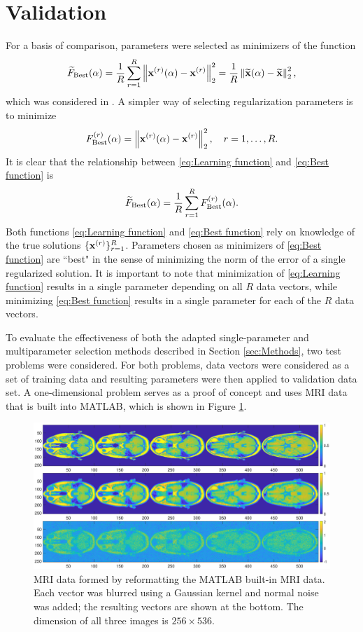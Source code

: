 \documentclass[12pt]{article}
\begin{document}
\section{Validation} \label{sec:Validation}
For a basis of comparison, parameters were selected as minimizers of the function
\begin{equation}
\label{eq:Learning function}
\widetilde{F}_{\text{Best}}(\alpha) = \frac{1}{R}\sum_{r=1}^R \left\|\mathbf{x}^{(r)}(\alpha) - \mathbf{x}^{(r)}\right\|_2^2 = \frac{1}{R}\left\|\widetilde{\mathbf{x}}(\alpha) - \widetilde{\mathbf{x}}\right\|_2^2,
\end{equation} 
which was considered in \cite{ChungEspanol2017}. A simpler way of selecting regularization parameters is to minimize
\begin{equation}
\label{eq:Best function}
F_{\text{Best}}^{(r)}(\alpha) = \left\|\mathbf{x}^{(r)}(\alpha) - \mathbf{x}^{(r)}\right\|_2^2, \quad r = 1,\ldots,R.
\end{equation}
It is clear that the relationship between \eqref{eq:Learning function} and \eqref{eq:Best function} is
\[\widetilde{F}_{\text{Best}}(\alpha) = \frac{1}{R}\sum_{r=1}^R F_{\text{Best}}^{(r)}(\alpha).\]
Both functions \eqref{eq:Learning function} and \eqref{eq:Best function} rely on knowledge of the true solutions $\{\mathbf{x}^{(r)}\}_{r=1}^R$. Parameters chosen as minimizers of \eqref{eq:Best function} are ``best" in the sense of minimizing the norm of the error of a single regularized solution. It is important to note that minimization of \eqref{eq:Learning function} results in a single parameter depending on all $R$ data vectors, while minimizing \eqref{eq:Best function} results in a single parameter for each of the $R$ data vectors. \par
To evaluate the effectiveness of both the adapted single-parameter and multiparameter selection methods described in Section \ref{sec:Methods}, two test problems were considered. For both problems, data vectors were considered as a set of training data and resulting parameters were then applied to validation data set. A one-dimensional problem serves as a proof of concept and uses MRI data that is built into MATLAB, which is shown in Figure \ref{fig:MRI 1D}. 

\begin{figure}[ht]
\includegraphics[scale=0.32]{Figures/Full_MRI_Data.eps}
\caption{MRI data formed by reformatting the MATLAB built-in MRI data. Each vector was blurred using a Gaussian kernel and normal noise was added; the resulting vectors are shown at the bottom. The dimension of all three images is $256 \times 536$.}
\label{fig:MRI 1D}
\end{figure}
\end{document}
